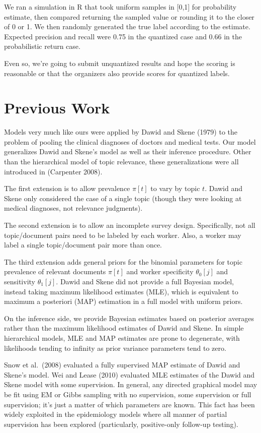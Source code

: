 \documentclass{article}
\begin{document}
We ran a simulation in R that took uniform samples in [0,1] for
probability estimate, then compared returning the sampled value
or rounding it to the closer of 0 or 1.  We then randomly generated
the true label according to the estimate.  Expected precision and recall were
0.75 in the quantized case and 0.66 in the probabilistic return case.

Even so, we're going to submit unquantized results and hope the
scoring is reasonable or that the organizers also provide scores for
quantized labels.  


\section{Previous Work}

Models very much like ours were applied by Dawid and Skene
(1979) to the problem of pooling the clinical diagnoses of doctors
and medical tests.  Our model generalizes Dawid and Skene's model as
well as their inference procedure.   Other than the hierarchical model
of topic relevance, these generalizations were all introduced in
(Carpenter 2008).

The first extension is to allow prevalence $\pi[t]$ to vary by topic
$t$.  Dawid and Skene only considered the case of a single topic
(though they were looking at medical diagnoses, not relevance
judgments).

The second extension is to allow an incomplete survey design.
Specifically, not all topic/document pairs need to be labeled by each
worker.  Also, a worker may label a single topic/document pair more
than once.

The third extension adds general priors for the binomial parameters
for topic prevalence of relevant documents $\pi[t]$ and worker
specificity $\theta_0[j]$ and sensitivity $\theta_1[j]$.  Dawid and
Skene did not provide a full Bayesian model, instead taking maximum
likelihood estimates (MLE), which is equivalent to maximum
a posteriori (MAP) estimation in a full model with uniform priors.

On the inference side, we provide Bayesian estimates based on 
posterior averages rather than the maximum likelihood estimates
of Dawid and Skene.  In simple hierarchical models, MLE and MAP estimates are
prone to degenerate, with likelihoods tending to infinity as 
prior variance parameters tend to zero.

Snow et al.~(2008) evaluated a fully supervised MAP estimate of Dawid
and Skene's model.  Wei and Lease (2010) evaluated MLE estimates of
the Dawid and Skene model with some supervision.  In general, any
directed graphical model may be fit using EM or Gibbs sampling with
no supervision, some supervision or full supervision; it's just a
matter of which parameters are known.   This fact has been widely
exploited in the epidemiology models where all manner of partial
supervision has been explored (particularly, positive-only follow-up
testing).
\end{document}
